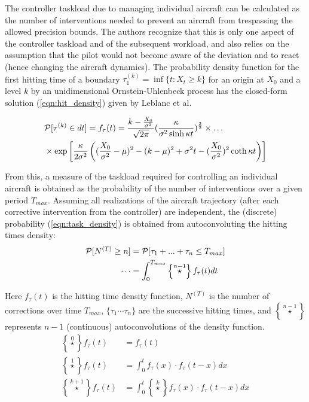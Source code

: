 \documentclass[conference]{IEEEtran}
\begin{document}
The controller taskload due to managing individual aircraft can be calculated as the number of interventions needed to prevent an aircraft from trespassing the allowed precision bounds. The authors recognize that this is only one aspect of the controller taskload and of the subsequent workload, and also relies on the assumption that the pilot would not become aware of the deviation and to react (hence changing the aircraft dynamics). The probability density function for the first hitting time of a boundary $\tau^{(k)}_1 =\inf\{t:X_t\ge k\}$ for an origin at $X_0$ and a level $k$ by an unidimensional Ornstein-Uhlenbeck process has the closed-form solution (\ref{eqn:hit_density}) given by Leblanc et al. \cite{Leb00}

\begin{align}
&\mathcal P[\tau^{(k)} \in dt]=f_{\tau}(t)= \dfrac{k-\frac{X_0}{\sigma^2}}{\sqrt{2\pi}}( \frac{\kappa}{\sigma^2 \sinh\kappa t} )^{\frac{3}{2}}\times\ldots \notag\\
&\times \exp \left[ \frac{\kappa}{2\sigma^2} \left( (\frac{X_0}{\sigma^2} -\mu )^2- (k-\mu)^2 +\sigma^2 t - (\frac{X_0}{\sigma^2})^2 \coth\kappa t  \right)  \right] \label{eqn:hit_density} 
\end{align}

From this, a measure of the taskload required for controlling an individual aircraft is obtained  as the probability of the number of interventions over a given period $T_{max}$. Assuming all realizations of the aircraft trajectory (after each corrective intervention from the controller) are independent, the (discrete) probability (\ref{eqn:task_density}) is obtained from autoconvoluting the hitting times density:
\begin{align} 
\mathcal P[N^{(T)}\ge n]&=\mathcal P[\tau_1+...+\tau_n \le T_{max}]\notag\\
\cdots &= \int_0^{T_{max}}\left\{\stackrel{n-1}{\star}\right\}f_{\tau}(t)dt \label{eqn:task_density}\end{align} 

Here $f_{\tau}(t)$ is the hitting time density function, $N^{(T)}$ is the number of corrections over time $T_{max}$, $\{\tau_1\cdots\tau_n\}$ are the successive hitting times, and $\left\{\stackrel{n-1}{\star}\right\}$ represents $n-1$ (continuous) autoconvolutions of the density function. 
 \begin{align*}
\left\{\stackrel{0}{\star}\right\}f_{\tau}(t)&=f_{\tau}(t) \\
\left\{\stackrel{1}{\star}\right\}f_{\tau}(t)&=\int_0^t f_{\tau}(x)\cdot f_{\tau}(t-x)dx \\
\left\{\stackrel{k+1}{\star}\right\}f_{\tau}(t)&=\int_0^t \left\{\stackrel{k}{\star}\right\}f_{\tau}(x)\cdot f_{\tau}(t-x)dx
\end{align*}
\end{document}
